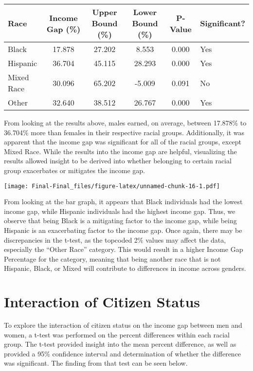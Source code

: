 \documentclass[
]{article}
\begin{document}
\begin{longtable}[]{@{}lccccl@{}}
\toprule
Race & Income Gap (\%) & Upper Bound (\%) & Lower Bound (\%) & P-Value &
Significant?\tabularnewline
\midrule
\endhead
Black & 17.878 & 27.202 & 8.553 & 0.000 & Yes\tabularnewline
Hispanic & 36.704 & 45.115 & 28.293 & 0.000 & Yes\tabularnewline
Mixed Race & 30.096 & 65.202 & -5.009 & 0.091 & No\tabularnewline
Other & 32.640 & 38.512 & 26.767 & 0.000 & Yes\tabularnewline
\bottomrule
\end{longtable}

From looking at the results above, males earned, on average, between
17.878\% to 36.704\% more than females in their respective racial
groups. Additionally, it was apparent that the income gap was
significant for all of the racial groups, except Mixed Race. While the
results into the income gap are helpful, visualizing the results allowed
insight to be derived into whether belonging to certain racial group
exacerbates or mitigates the income gap.

\texttt{[image: Final-Final\_files/figure-latex/unnamed-chunk-16-1.pdf]}

From looking at the bar graph, it appears that Black individuals had the
lowest income gap, while Hispanic individuals had the highest income
gap. Thus, we observe that being Black is a mitigating factor to the
income gap, while being Hispanic is an exacerbating factor to the income
gap. Once again, there may be discrepancies in the t-test, as the
topcoded 2\% values may affect the data, especially the ``Other Race''
category. This would result in a higher Income Gap Percentage for the
category, meaning that being another race that is not Hispanic, Black,
or Mixed will contribute to differences in income across genders.

\hypertarget{interaction-of-citizen-status}{%
\section{Interaction of Citizen
Status}\label{interaction-of-citizen-status}}

To explore the interaction of citizen status on the income gap between
men and women, a t-test was performed on the percent differences within
each racial group. The t-test provided insight into the mean percent
difference, as well as provided a 95\% confidence interval and
determination of whether the difference was significant. The finding
from that test can be seen below.
\end{document}
